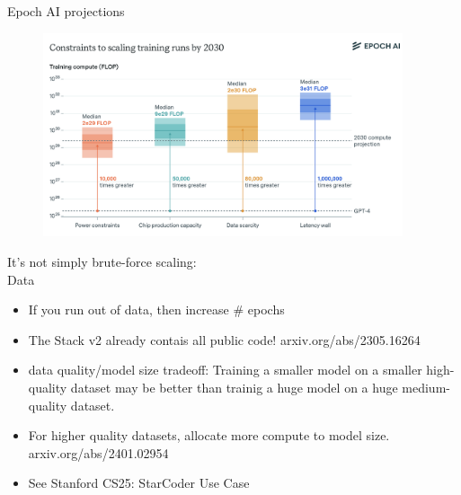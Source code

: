 \begin{vbframe}{Epoch AI projections}

\vfill

\begin{figure}
	\centering
	\includegraphics[height = 6cm]{./figure/epochai.png} 
\end{figure}



\vfill

\end{vbframe}


\begin{vbframe}{It's not simply brute-force scaling:\\ Data}

\vfill

\begin{itemize}
	\item If you run out of data, then increase \# epochs
        \item The Stack v2
	already contais all public code! arxiv.org/abs/2305.16264
        \item data quality/model size tradeoff: Training
	a smaller model on  a smaller high-quality dataset may be
	better than trainig a huge model on a huge
	medium-quality dataset.
        \item For higher quality datasets, allocate more
	compute to model size. arxiv.org/abs/2401.02954
        \item See Stanford CS25: StarCoder Use Case

\end{itemize}

\vfill

\end{vbframe}


